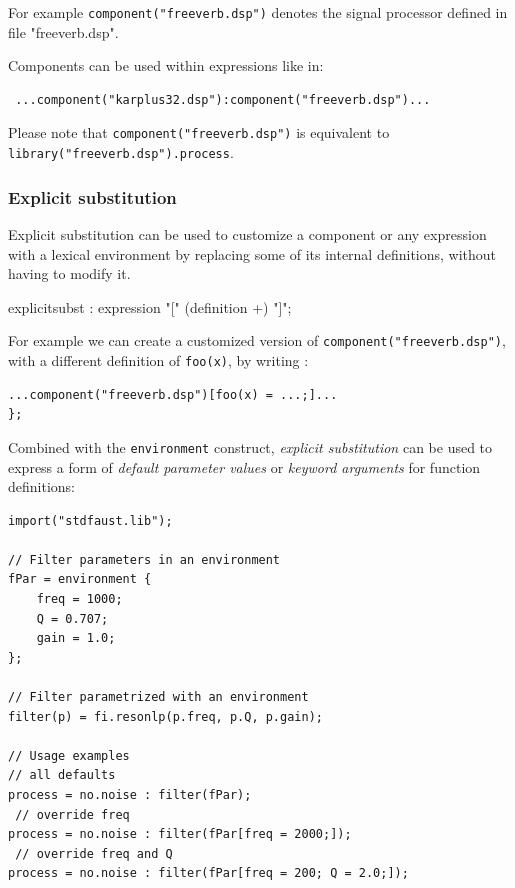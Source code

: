  For example \lstinline'component("freeverb.dsp")' denotes the signal processor defined in file "freeverb.dsp". 
 
 Components can be used within expressions like in: 
 \begin{lstlisting}
 ...component("karplus32.dsp"):component("freeverb.dsp")... 
 \end{lstlisting}
 
 Please note that \lstinline'component("freeverb.dsp")' is equivalent to \lstinline'library("freeverb.dsp").process'.

\subsubsection{Explicit substitution} 

Explicit substitution can be used to customize a component or any expression with a lexical environment by replacing some of its internal definitions, without having to modify it.


\begin{rail}
explicitsubst : expression "[" (definition +) "]";
\end{rail}

For example we can create a customized version of \lstinline'component("freeverb.dsp")', with a different definition of \lstinline'foo(x)', by writing :
\begin{lstlisting}
...component("freeverb.dsp")[foo(x) = ...;]...
};
\end{lstlisting}

Combined with the  \lstinline'environment' construct, \textit{explicit substitution} can be used to express a form of \textit{default parameter values} or \textit{keyword arguments} for function definitions:

\begin{lstlisting}
import("stdfaust.lib");

// Filter parameters in an environment  
fPar = environment {
    freq = 1000;
    Q = 0.707;
    gain = 1.0;
};

// Filter parametrized with an environment
filter(p) = fi.resonlp(p.freq, p.Q, p.gain);

// Usage examples
// all defaults
process = no.noise : filter(fPar);                    
 // override freq    
process = no.noise : filter(fPar[freq = 2000;]);     
 // override freq and Q    
process = no.noise : filter(fPar[freq = 200; Q = 2.0;]); 
\end{lstlisting}

